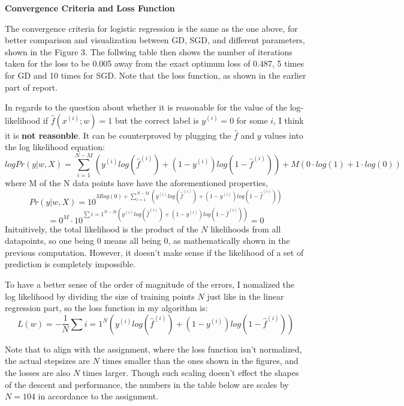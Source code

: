 \documentclass{article} %
\begin{document}
\textbf{Convergence Criteria and Loss Function}

  The convergence criteria for logistic regression is the same as the one above, for better comparison and visualization between GD, SGD, and different parameters, shown in the Figure 3. The follwing table then shows the number of iterations taken for the loss to be 0.005 away from the exact optimum loss of 0.487, 5 times for GD and 10 times for SGD. Note that the loss function, as shown in the earlier part of report.

  In regards to the question about whether it is reasonable for the value of the log-likelihood if $\hat f(x^{(i)}; w) = 1$ but the correct label is $y^{(i)} = 0$ for some $i$, I think it is \textbf{not reasonble}. It can be counterproved by plugging the $\hat f$ and $y$ values into the log likelihood equation:
  $$log Pr(y|w, X) = \sum_{i=1}^{N-M}(y^{(i)}log(\hat f^{(i)}) + (1 - y^{(i)})log(1 - \hat f^{(i)})) + M(0 \cdot log(1) + 1 \cdot log(0))$$
  where M of the N data points have have the aforementioned properties,
  $$Pr(y|w, X) = 10^{Mlog(0) + \sum_{i=1}^{N-M}(y^{(i)}log(\hat f^{(i)}) + (1 - y^{(i)})log(1 - \hat f^{(i)}))} $$
  $$= 0^M \cdot 10^{\sum{i=1}^{N-M}(y^{(i)}log(\hat f^{(i)}) + (1 - y^{(i)})log(1 - \hat f^{(i)}))} = 0$$
  Inituitively, the total likelihood is the product of the $N$ likelihoods from all datapoints, so one being 0 means all being 0, as mathematically shown in the previous computation. However, it doesn't make sense if the likelihood of a set of prediction is completely impossible.

  To have a better sense of the order of magnitude of the errors, I nomalized the log likelihood by dividing the size of training points $N$ just like in the linear regression part, so the loss function in my algorithm is:
  $$L(w) = -\frac{1}{N}\sum{i=1}^N(y^{(i)}log(\hat f^{(i)}) + (1 - y^{(i)})log(1 - \hat f^{(i)}))$$

  Note that to align with the assignment, where the loss function isn't normalized, the actual stepsizes are $N$ times smaller than the ones shown in the figures, and the losses are also $N$ times larger. Though such scaling doesn't effect the shapes of the descent and performance, the numbers in the table below are scales by $N=104$ in accordance to the assignment.
\end{document}
